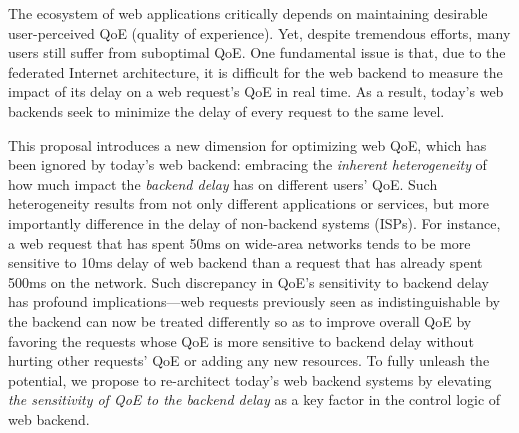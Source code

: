 \noindent The ecosystem of web applications critically depends on maintaining desirable user-perceived QoE (quality of experience).
Yet, despite tremendous efforts,
many users still suffer from suboptimal QoE.
One fundamental issue is that, due to the federated Internet architecture, it is difficult for the web backend to measure the impact of its delay on a web request's QoE in real time. As a result, today's web backends seek to minimize the delay of every request to the same level.

This proposal introduces a new dimension for optimizing web QoE, which has been ignored by today's web backend: embracing the {\em inherent heterogeneity} of how much impact the {\em backend delay} has on different users' QoE. Such heterogeneity results from not only different applications or services, but more importantly difference in the delay of non-backend systems (\eg ISPs).
For instance, a web request that has spent 50ms on wide-area networks tends to be more sensitive to 10ms delay of web backend than a request that has already spent 500ms on the network. 
Such discrepancy in QoE's sensitivity to backend delay has profound implications---web requests previously seen as indistinguishable by the backend can now be treated differently so as to improve overall QoE by favoring the requests whose QoE is more sensitive to backend delay without hurting other requests' QoE or adding any new resources.
To fully unleash the potential, we propose to re-architect today's web backend systems by elevating {\em the sensitivity of QoE to the backend delay} as a key factor in the control logic of web backend.
